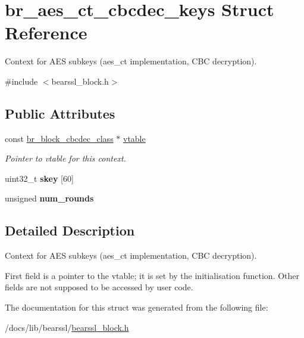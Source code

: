 \hypertarget{structbr__aes__ct__cbcdec__keys}{}\section{br\+\_\+aes\+\_\+ct\+\_\+cbcdec\+\_\+keys Struct Reference}
\label{structbr__aes__ct__cbcdec__keys}


Context for A\+ES subkeys ({\ttfamily aes\+\_\+ct} implementation, C\+BC decryption).  




{\ttfamily \#include $<$bearssl\+\_\+block.\+h$>$}

\subsection*{Public Attributes}
\begin{DoxyCompactItemize}
\item 
\mbox{\label{structbr__aes__ct__cbcdec__keys_a2cce0eacfebf4fb19ec3877e39d9597f}} 
const \hyperlink{bearssl__block_8h_a5542970c820eeee2e62766368be8fb7f}{br\+\_\+block\+\_\+cbcdec\+\_\+class} $\ast$ \hyperlink{structbr__aes__ct__cbcdec__keys_a2cce0eacfebf4fb19ec3877e39d9597f}{vtable}
\begin{DoxyCompactList}\small\item\em Pointer to vtable for this context. \end{DoxyCompactList}\item 
\mbox{\label{structbr__aes__ct__cbcdec__keys_a03286295864ea1f6dacd4cf51dc82ed7}} 
uint32\+\_\+t {\bfseries skey} \mbox{[}60\mbox{]}
\item 
\mbox{\label{structbr__aes__ct__cbcdec__keys_ac20e6025dadccafe84624297b06b9550}} 
unsigned {\bfseries num\+\_\+rounds}
\end{DoxyCompactItemize}


\subsection{Detailed Description}
Context for A\+ES subkeys ({\ttfamily aes\+\_\+ct} implementation, C\+BC decryption). 

First field is a pointer to the vtable; it is set by the initialisation function. Other fields are not supposed to be accessed by user code. 

The documentation for this struct was generated from the following file\+:\begin{DoxyCompactItemize}
\item 
/docs/lib/bearssl/\hyperlink{bearssl__block_8h}{bearssl\+\_\+block.\+h}\end{DoxyCompactItemize}
